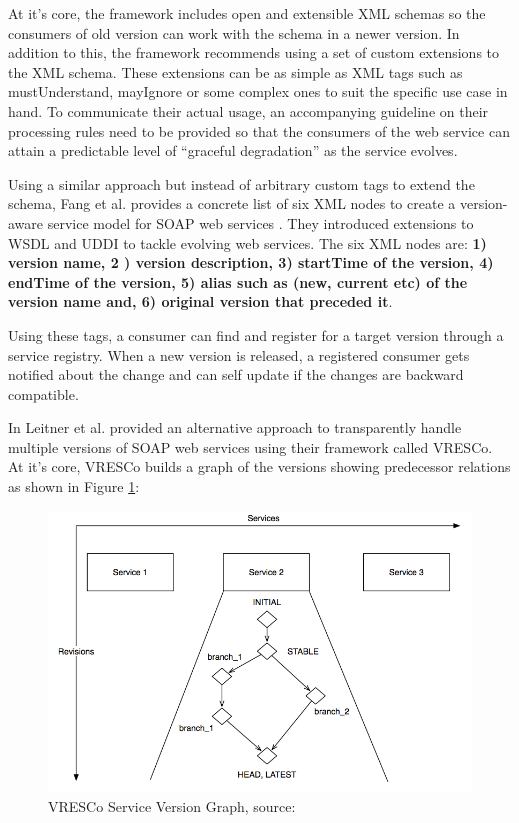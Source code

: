 \documentclass[runningheads,a4paper]{llncs}
\begin{document}
At it’s core, the framework includes open and extensible XML schemas so the consumers of old version can work with the schema in a newer version. In addition to this, the framework recommends using a set of custom extensions to the XML schema. These extensions can be as simple as XML tags such as mustUnderstand, mayIgnore or some complex ones to suit the specific use case in hand. To communicate their actual usage, an accompanying guideline on their processing rules need to be provided so that the consumers of the web service can attain a predictable level of ``graceful degradation'' as the service evolves.

Using a similar approach but instead of arbitrary custom tags to extend the schema, Fang et al. provides a concrete list of six XML nodes to create a version-aware service model for SOAP web services \cite{fang2007version}. They introduced extensions to WSDL and UDDI \cite{uddi_wiki} to tackle evolving web services. The six XML nodes are: \textbf{1) version name, 2 ) version description, 3) startTime of the version, 4) endTime of the version, 5) alias such as (new, current etc) of the version name and, 6) original version that preceded it}.

Using these tags, a consumer can find and register for a target version through a service registry. When a new version is released, a registered consumer gets notified about the change and can self update if the changes are backward compatible.

In \cite{leitner2008end} Leitner et al. provided an alternative approach to transparently handle multiple versions of SOAP web services using their framework called VRESCo. At it’s core, VRESCo builds a graph of the versions showing predecessor relations as shown in Figure \ref{fig:vresco}:

\begin{figure}[bt]
  \centering
  \includegraphics[scale=0.35]{vresco.png}
    \caption{VRESCo Service Version Graph, source: \cite{leitner2008end}}
  \label{fig:vresco}
\end{figure}
\end{document}
